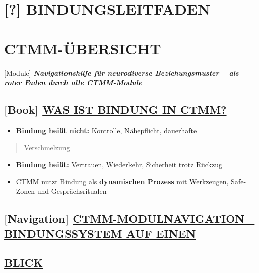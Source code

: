 \hypertarget{bindungsleitfaden}{%
\section{\texorpdfstring{\textbf{[?] BINDUNGSLEITFADEN --}}{[?] BINDUNGSLEITFADEN --}}\label{bindungsleitfaden}}

\hypertarget{ctmm-uxfcbersicht}{%
\section{\texorpdfstring{\textbf{CTMM-ÜBERSICHT}}{CTMM-ÜBERSICHT}}\label{ctmm-uxfcbersicht}}

[Module] \emph{\textbf{Navigationshilfe für neurodiverse Beziehungsmuster -- als roter Faden durch alle CTMM-Module}}

\hypertarget{was-ist-bindung-in-ctmm}{%
\subsection{\texorpdfstring{\textbf{[Book] \ul{WAS IST BINDUNG IN CTMM?}}}{[Book] WAS IST BINDUNG IN CTMM?}}\label{was-ist-bindung-in-ctmm}}

\begin{itemize}
\tightlist
\item
  \textbf{Bindung heißt nicht:} Kontrolle, Nähepflicht, dauerhafte
\end{itemize}

\begin{quote}
Verschmelzung
\end{quote}

\begin{itemize}
\tightlist
\item
  \textbf{Bindung heißt:} Vertrauen, Wiederkehr, Sicherheit trotz Rückzug
\item
  CTMM nutzt Bindung als \textbf{dynamischen Prozess} mit Werkzeugen, Safe-Zonen und Gesprächsritualen
\end{itemize}

\hypertarget{ctmm-modulnavigation-bindungssystem-auf-einen}{%
\subsection{\texorpdfstring{\textbf{[Navigation] \ul{CTMM-MODULNAVIGATION -- BINDUNGSSYSTEM AUF EINEN}}}{[Navigation] CTMM-MODULNAVIGATION -- BINDUNGSSYSTEM AUF EINEN}}\label{ctmm-modulnavigation-bindungssystem-auf-einen}}

\hypertarget{blick}{%
\subsection{\texorpdfstring{ \textbf{\ul{BLICK}}}{ BLICK}}\label{blick}}

